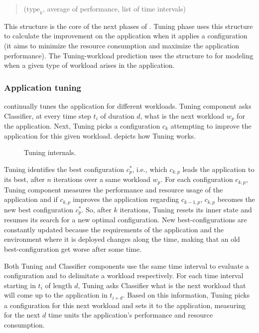 \begin{quote}
  \centering
  ($\text{type}_k$, average of performance, list of time intervals)
\end{quote}

This structure is the core of the next phases of \name. Tuning phase uses this
structure to calculate the improvement on the application when it applies a
configuration (it aims to minimize the resource consumption and maximize the
application performance). The Tuning-workload prediction uses the structure to
for modeling when a given type of workload arises in the application.

\subsubsection{Application tuning}

\name continually tunes the application for different workloads. Tuning
component asks Classifier, at every time step $t_i$ of duration $d$, what is the
next workload $w_p$ for the application. Next, Tuning picks a configuration
$c_k$ attempting to improve the application for this given workload.
 depicts how Tuning works.

\begin{figure*}[htp]
  \centering
  \def\svcwidth{\textwidth}
  \scalebox{1.0}{}
  \caption{Tuning internals.}
  \label{fig:tuning-internals}
\end{figure*}

Tuning identifies the best configuration $c^*_p$, i.e., which $c_{k, p}$ leads
the application to its best, after $n$ iterations over a same workload $w_p$.
For each configuration $c_{k,p}$, Tuning component measures the performance and
resource usage of the application and if $c_{k,p}$ improves the application
regarding $c_{k-1, p}$, $c_{k,p}$ becomes the new best configuration $c^*_p$.
So, after $k$ iterations, Tuning resets its inner state and resumes its search
for a new optimal configuration. New best-configurations are constantly updated
because the requirements of the application and the environment where it is
deployed changes along the time, making that an old best-configuration get worse
after some time.

Both Tuning and Classifier components use the same time interval to evaluate a
configuration and to delimitate a workload respectively. For each time interval
starting in $t_i$ of length $d$, Tuning asks Classifier what is the next
workload that will come up to the application in $t_{i+d}$. Based on this
information, Tuning picks a configuration for this next workload and sets it to
the application, measuring for the next $d$ time units the application's
performance and resource consumption.

